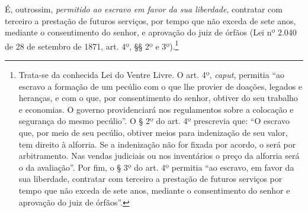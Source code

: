 É, outrossim, \emph{permitido ao escravo em favor da sua liberdade},
contratar com terceiro a prestação de futuros serviços, por tempo que
não exceda de sete anos, mediante o consentimento do senhor, e aprovação
do juiz de órfãos (Lei nº 2.040 de 28 de setembro de 1871, art. 4º, §§
2º e 3º).\footnote{ Trata-se da conhecida Lei do Ventre Livre. O art.
  4º, \emph{caput}, permitia ``ao escravo a formação de um pecúlio com o
  que lhe provier de doações, legados e heranças, e com o que, por
  consentimento do senhor, obtiver do seu trabalho e economias. O
  governo providenciará nos regulamentos sobre a colocação e segurança
  do mesmo pecúlio''. O § 2º do art. 4º prescrevia que: ``O escravo que,
  por meio de seu pecúlio, obtiver meios para indenização de seu valor,
  tem direito à alforria. Se a indenização não for fixada por acordo, o
  será por arbitramento. Nas vendas judiciais ou nos inventários o preço
  da alforria será o da avaliação''. Por fim, o § 3º do art. 4º permitia
  ``ao escravo, em favor da sua liberdade, contratar com terceiro a
  prestação de futuros serviços por tempo que não exceda de sete anos,
  mediante o consentimento do senhor e aprovação do juiz de órfãos''.}

\asterisc

